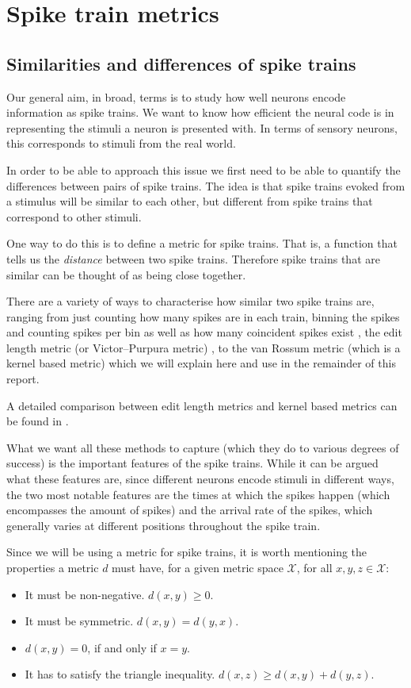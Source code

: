 \documentclass[10pt,a4paper]{book}
\begin{document}
\chapter{Spike train metrics}

\section{Similarities and differences of spike trains}

Our general aim, in broad, terms is to study how well neurons encode information as spike trains. We want to know how efficient the neural code is in representing the stimuli a neuron is presented with. In terms of sensory neurons, this corresponds to stimuli from the real world.

In order to be able to approach this issue we first need to be able to quantify the differences between pairs of spike trains. The idea is that spike trains evoked from a stimulus will be similar to each other, but different from spike trains that correspond to other stimuli.

One way to do this is to define a metric for spike trains. That is, a function that tells us the \emph{distance} between two spike trains. Therefore spike trains that are similar can be thought of as being close together.

There are a variety of ways to characterise how similar two spike trains are, ranging from just counting how many spikes are in each train, binning the spikes and counting spikes per bin as well as how many coincident spikes exist \cite{kistler97}, the edit length metric (or Victor--Purpura metric) \cite{victor_purpura}, to the van Rossum metric \cite{vanRossum} (which is a kernel based metric) which we will explain here and use in the remainder of this report.

A detailed comparison between edit length metrics and kernel based metrics can be found in \cite{houghton_victor10}.

What we want all these methods to capture (which they do to various degrees of success) is the important features of the spike trains. While it can be argued what these features are, since different neurons encode stimuli in different ways, the two most notable features are the times at which the spikes happen (which encompasses the amount of spikes) and the arrival rate of the spikes, which generally varies at different positions throughout the spike train.

Since we will be using a metric for spike trains, it is worth mentioning the properties a metric $d$ must have, for a given metric space $\mathcal{X}$, for all $x, y, z \in \mathcal{X}$:
\begin{itemize}
\item It must be non-negative. $d(x,y) \geq 0$.
\item It must be symmetric. $d(x,y) = d(y,x)$.
\item $d(x, y) = 0$, if and only if $x = y$.
\item It has to satisfy the triangle inequality. $d(x,z) \geq d(x,y) + d(y,z)$.
\end{itemize}
\end{document}
